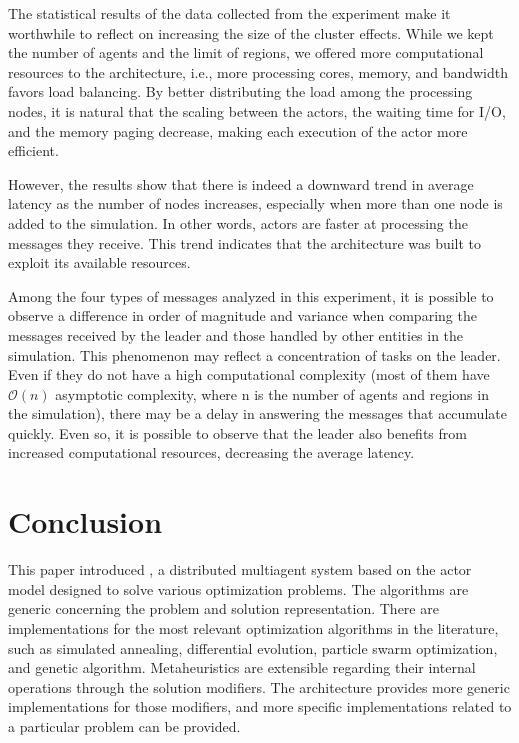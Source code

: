 \documentclass[preprint,12pt]{elsarticle}
\begin{document}
The statistical results of the data collected from the experiment make it worthwhile to reflect on increasing the size of the cluster effects. While we kept the number of agents and the limit of regions, we offered more computational resources to the architecture, i.e., more processing cores, memory, and bandwidth favors load balancing. By better distributing the load among the processing nodes, it is natural that the scaling between the actors, the waiting time for I/O, and the memory paging decrease, making each execution of the actor more efficient.

However, the results show that there is indeed a downward trend in average latency as the number of nodes increases, especially when more than one node is added to the simulation. In other words, actors are faster at processing the messages they receive. This trend indicates that the architecture was built to exploit its available resources.

Among the four types of messages analyzed in this experiment, it is possible to observe a difference in order of magnitude and variance when comparing the messages received by the leader and those handled by other entities in the simulation. This phenomenon may reflect a concentration of tasks on the leader. Even if they do not have a high computational complexity (most of them have $\mathcal{O}(n)$ asymptotic complexity, where n is the number of agents and regions in the simulation), there may be a delay in answering the messages that accumulate quickly. Even so, it is possible to observe that the leader also benefits from increased computational resources, decreasing the average latency.

\section{Conclusion}
\label{sec:conclusion}

This paper introduced , a distributed multiagent system based on the actor model designed to solve various optimization problems. The algorithms are generic concerning the problem and solution representation. There are implementations for the most relevant optimization algorithms in the literature, such as simulated annealing, differential evolution, particle swarm optimization, and genetic algorithm. Metaheuristics are extensible regarding their internal operations through the solution modifiers. The architecture provides more generic implementations for those modifiers, and more specific implementations related to a particular problem can be provided.
\end{document}
